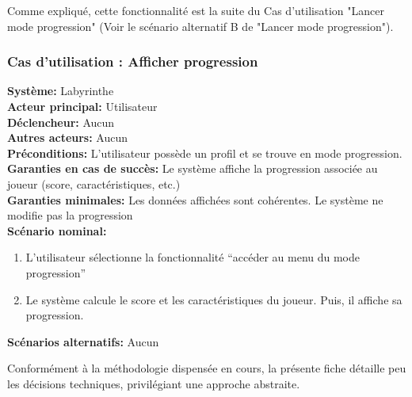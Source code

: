 \documentclass{butexFR}
\begin{document}

Comme expliqué, cette fonctionnalité est la suite du Cas d'utilisation "Lancer mode progression" (Voir le scénario alternatif B de "Lancer mode progression").

\newpage

\subsubsection{Cas d'utilisation : Afficher progression}
\textbf{Système:} Labyrinthe\\
\textbf{Acteur principal:} Utilisateur\\
\textbf{Déclencheur:} Aucun\\
\textbf{Autres acteurs:} Aucun\\[0.25em]
\textbf{Préconditions:} L'utilisateur possède un profil et se trouve en mode progression.\\
\textbf{Garanties en cas de succès:} Le système affiche la progression associée au joueur
(score, caractéristiques, etc.)\\
\textbf{Garanties minimales:} Les données affichées sont cohérentes. Le système ne modifie pas la progression\\[0.25em]
\textbf{Scénario nominal:}
\begin{enumerate}
    \item L'utilisateur sélectionne la fonctionnalité ``accéder au menu du mode progression''
    \item Le système calcule le score et les caractéristiques du joueur. Puis, il affiche sa progression.
\end{enumerate}
\textbf{Scénarios alternatifs:} Aucun

\smallskip
{}
Conformément à la méthodologie dispensée en cours, la présente fiche détaille peu les décisions techniques, privilégiant une approche abstraite.

\newpage
\end{document}
